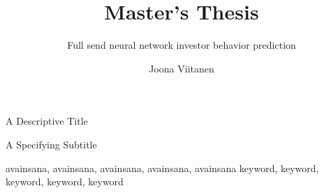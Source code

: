 \title{Master's Thesis}{A Descriptive Title}
\subtitle{Full send neural network investor behavior prediction}{A Specifying Subtitle}

\author{Joona Viitanen}





\keywords%
    {avainsana, avainsana, avainsana, avainsana, avainsana}
    {keyword, keyword, keyword, keyword, keyword}

\maketitle




